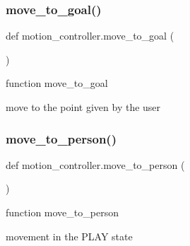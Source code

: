 \subsubsection{\texorpdfstring{move\+\_\+to\+\_\+goal()}{move\_to\_goal()}}
{\footnotesize\ttfamily def motion\+\_\+controller.\+move\+\_\+to\+\_\+goal (\begin{DoxyParamCaption}{ }\end{DoxyParamCaption})}



function move\+\_\+to\+\_\+goal 

move to the point given by the user \mbox{\label{namespacemotion__controller_a539bdfd40405e3ecb739d369e9ab8c5a}} 
\subsubsection{\texorpdfstring{move\+\_\+to\+\_\+person()}{move\_to\_person()}}
{\footnotesize\ttfamily def motion\+\_\+controller.\+move\+\_\+to\+\_\+person (\begin{DoxyParamCaption}{ }\end{DoxyParamCaption})}



function move\+\_\+to\+\_\+person 

movement in the P\+L\+AY state 